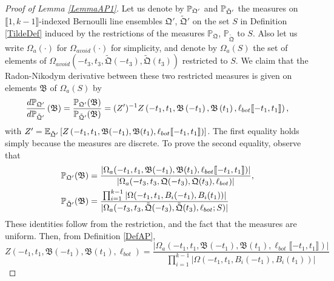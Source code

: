 \begin{proof}[Proof of Lemma \ref{LemmaAP1}]
	
	Let us denote by $\mathbb{P}_{\mathfrak{Q}'}$ and $\mathbb{P}_{\tilde{\mathfrak{Q}}'}$ the measures on $\llbracket 1, k-1\rrbracket$-indexed Bernoulli line ensembles $\mathfrak{Q}'$, $\tilde{\mathfrak{Q}}'$ on the set $S$ in Definition \ref{TildeDef} induced by the restrictions of the measures $\mathbb{P}_{\mathfrak{Q}}$, $\mathbb{P}_{\tilde{\mathfrak{Q}}}$ to $S$. Also let us write $\Omega_a(\cdot)$ for $\Omega_{avoid}(\cdot)$ for simplicity, and denote by $\Omega_a(S)$ the set of elements of $\Omega_{avoid}(-t_3,t_3,\tilde{\mathfrak{Q}}(-t_3),\tilde{\mathfrak{Q}}(t_3))$ restricted to $S$. We claim that the Radon-Nikodym derivative between these two restricted measures is given on elements $\mathfrak B$ of $\Omega_a(S)$ by \begin{equation}\label{propRadon}
		\frac{d\mathbb{P}_{\mathfrak{Q}'}}{d\mathbb{P}_{\tilde{\mathfrak{Q}}'}}\left(\mathfrak B\right) = \frac{\mathbb{P}_{\mathfrak{Q}'}(\mathfrak{B})}{\mathbb{P}_{\tilde{\mathfrak{Q}}'}(\mathfrak{B})} = (Z')^{-1} Z\left(-t_1,t_1,\mathfrak{B}\left(-t_1\right),\mathfrak{B}\left(t_1\right),\ell_{bot}\llbracket -t_1,t_1\rrbracket\right),
	\end{equation}
	with $Z' = \mathbb{E}_{\tilde{\mathfrak{Q}}'}\left[Z\left(-t_1, t_1, \mathfrak B(-t_1), \mathfrak B(t_1), \ell_{bot}\llbracket -t_1, t_1\rrbracket\right)\right]$. The first equality holds simply because the measures are discrete. To prove the second equality, observe that
	\begin{equation}
		\begin{split}
			\mathbb{P}_{\mathfrak{Q}'}(\mathfrak{B}) &= \frac{|\Omega_a(-t_1,t_1,\mathfrak{B}(-t_1),\mathfrak{B}(t_1),\ell_{bot}\llbracket -t_1,t_1\rrbracket)|}{|\Omega_a(-t_3,t_3,{\mathfrak{Q}}(-t_3),{\mathfrak{Q}}(t_3),\ell_{bot})|}, 
			\\
			\mathbb{P}_{\tilde{\mathfrak{Q}}'}(\mathfrak{B}) &= \frac{\prod_{i = 1}^{k-1}|\Omega(-t_1,t_1,B_i(-t_1),B_i(t_1))|}{|\Omega_a(-t_3,t_3,\tilde{\mathfrak{Q}}(-t_3),\tilde{\mathfrak{Q}}(t_3),\ell_{bot};S)|}
		\end{split}
	\end{equation}
	These identities follow from the restriction, and the fact that the measures are uniform. Then, from Definition \ref{DefAP}, 
	\[
	Z(-t_1,t_1,\mathfrak{B}(-t_1),\mathfrak{B}(t_1),\ell_{bot}) = \frac{|\Omega_a(-t_1,t_1,\mathfrak{B}(-t_1),\mathfrak{B}(t_1),\ell_{bot}\llbracket-t_1,t_1\rrbracket)|}{\prod_{i = 1}^{k-1}|\Omega(-t_1,t_1, B_i(-t_1),B_i(t_1))|}
\]
\end{proof}
